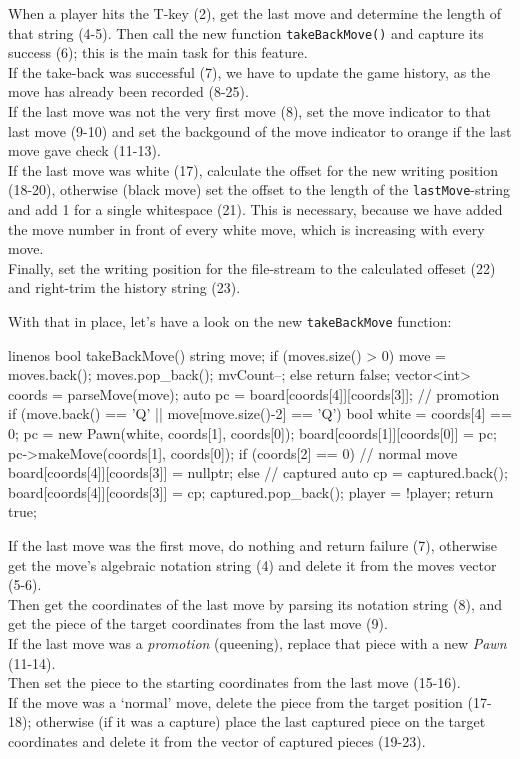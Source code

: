 When a player hits the T-key (2), get the last move and determine the length of that string (4-5).
Then call the new function \texttt{takeBackMove()} and capture its success (6);
this is the main task for this feature.\\
If the take-back was successful (7), we have to update the game history, as the move has already
been recorded (8-25).\\
If the last move was not the very first move (8), set the move indicator to that last move (9-10)
and set the backgound of the move indicator to orange if the last move gave check (11-13).\\
If the last move was white (17), calculate the offset for the new writing position (18-20),
otherwise (black move) set the offset to the length of the \texttt{lastMove}-string
and add 1 for a single whitespace (21).
This is necessary, because we have added the move number in front of every white move, which is
increasing with every move.\\
Finally, set the writing position for the file-stream to the calculated offeset (22) and
right-trim the history string (23).

With that in place, let's have a look on the new \texttt{takeBackMove} function:

\begin{cpp*}{linenos}
bool takeBackMove() {
  string move;
  if (moves.size() > 0) {
    move = moves.back();
    moves.pop_back();
    mvCount--;
  } else return false;
  vector<int> coords = parseMove(move);
  auto pc = board[coords[4]][coords[3]];
  // promotion
  if (move.back() == 'Q' || move[move.size()-2] == 'Q') {
    bool white = coords[4] == 0;
    pc = new Pawn(white, coords[1], coords[0]);
  }
  board[coords[1]][coords[0]] = pc;
  pc->makeMove(coords[1], coords[0]);
  if (coords[2] == 0) { // normal move
    board[coords[4]][coords[3]] = nullptr;
  } else { // captured
    auto cp = captured.back();
    board[coords[4]][coords[3]] = cp;
    captured.pop_back();
  }
  player = !player;
  return true;
}
\end{cpp*}

If the last move was the first move, do nothing and return failure (7), otherwise get the move's
algebraic notation string (4) and delete it from the moves vector (5-6).\\
Then get the coordinates of the last move by parsing its notation string (8),
and get the piece of the target coordinates from the last move (9).\\
If the last move was a \emph{promotion} (queening), replace that piece with a new \emph{Pawn} (11-14).\\
Then set the piece to the starting coordinates from the last move (15-16).\\
If the move was a `normal' move, delete the piece from the target position (17-18);
otherwise (if it was a capture) place the last captured piece on the target coordinates and
delete it from the vector of captured pieces (19-23).

